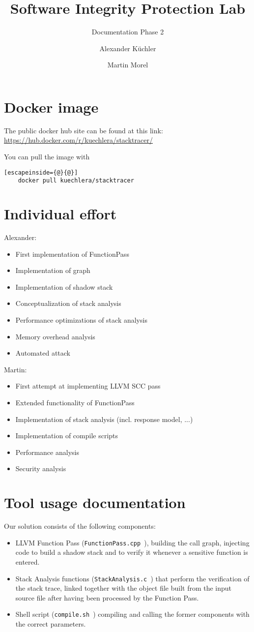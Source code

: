 \documentclass{llncs}
\title{Software Integrity Protection Lab}
\subtitle{Documentation Phase 2}
\author{Alexander K\"uchler \and Martin Morel}
\institute{Technical University of Munich\\
Department of Computer Science\\
\email{kuechler@in.tum.de}, \email{martin.morel@tum.de}}
\newcommand{\llvmpass}{\texttt{FunctionPass.cpp }}
\newcommand{\stacka}{\texttt{StackAnalysis.c }}
\newcommand{\script}{\texttt{compile.sh }}
\begin{document}
\maketitle

\section{Docker image}
The public docker hub site can be found at this link: \url{https://hub.docker.com/r/kuechlera/stacktracer/}

You can pull the image with
\begin{lstlisting}[escapeinside={@}{@}]
    docker pull kuechlera/stacktracer
\end{lstlisting}

\section{Individual effort}
Alexander:
\begin{itemize}
  \item First implementation of FunctionPass
  \item Implementation of graph
  \item Implementation of shadow stack
  \item Conceptualization of stack analysis
  \item Performance optimizations of stack analysis
  \item Memory overhead analysis
  \item Automated attack
\end{itemize}
Martin:
\begin{itemize}
  \item First attempt at implementing LLVM SCC pass
  \item Extended functionality of FunctionPass
  \item Implementation of stack analysis (incl. response model, ...)
  \item Implementation of compile scripts
  \item Performance analysis
  \item Security analysis
\end{itemize}

\newpage

\section{Tool usage documentation}
Our solution consists of the following components:
\begin{itemize}
  \item LLVM Function Pass (\llvmpass), building the call graph, injecting code to build a shadow stack and to verify it whenever a sensitive function is entered.
  \item Stack Analysis functions (\stacka) that perform the verification of the stack trace, linked together with the object file built from the input source file after having been processed by the Function Pass.
  \item Shell script (\script) compiling and calling the former components with the correct parameters.
\end{itemize}
\end{document}
